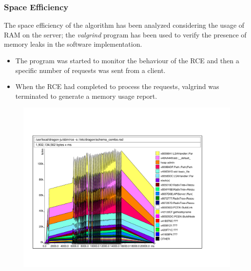 \documentclass{beamer}
\begin{document}
\frame
{
  \frametitle{Space Efficiency}

  The space efficiency of the algorithm has been analyzed considering
  the usage of RAM on the server; the \textit{valgrind} program has
  been used to verify the presence of memory leaks in the software
  implementation.

  \begin{itemize}
  \item The program was started to monitor the behaviour of the RCE
    and then a specific number of requests was sent from a client.
  \item When the RCE had completed to process the requests, valgrind
    was terminated to generate a memory usage report.
  \end{itemize}
}
\frame
{
  \begin{figure}[!htbp]
    \begin{center}
      \includegraphics[width=1\textwidth]{img/multi-100}
    \end{center}
  \end{figure}
}
\end{document}
